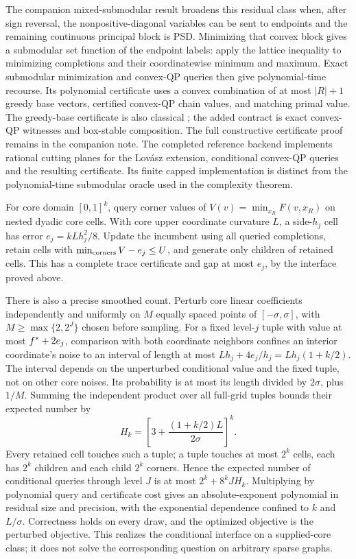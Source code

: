 The companion mixed-submodular result broadens this residual class when,
after sign reversal, the nonpositive-diagonal variables can be sent to
endpoints and the remaining continuous principal block is PSD. Minimizing
that convex block gives a submodular set function of the endpoint labels:
apply the lattice inequality to minimizing completions and their
coordinatewise minimum and maximum. Exact submodular minimization and
convex-QP queries then give polynomial-time recourse. Its polynomial
certificate uses a convex combination of at most $|R|+1$ greedy base
vectors, certified convex-QP chain values, and matching primal value.
The greedy-base certificate is also classical
\cite{IwataFleischerFujishige2001}; the added contract is exact
convex-QP witnesses and box-stable composition.
The full constructive certificate proof remains in the companion note.
The completed reference backend implements rational cutting planes for the
Lov\'asz extension, conditional convex-QP queries and the resulting
certificate. Its finite capped implementation is distinct from the
polynomial-time submodular oracle used in the complexity theorem.

For core domain $[0,1]^k$, query corner values of
$V(v)=\min_{x_R}F(v,x_R)$ on nested dyadic core cells. With core upper
coordinate curvature $L$, a side-$h_j$ cell has error
$e_j=kLh_j^2/8$. Update the incumbent using all queried completions,
retain cells with $\min_{\rm corners}V-e_j\le U$, and generate only
children of retained cells. This has a complete trace certificate and
gap at most $e_j$, by the interface proved above.

There is also a precise smoothed count. Perturb core linear coefficients
independently and uniformly on $M$ equally spaced points of
$[-\sigma,\sigma]$, with $M\ge\max\{2,2^J\}$ chosen before sampling.
For a fixed level-$j$ tuple with value at most $f^*+2e_j$, comparison
with both coordinate neighbors confines an interior coordinate's noise
to an interval of length at most $Lh_j+4e_j/h_j=Lh_j(1+k/2)$.
The interval depends on the unperturbed conditional value and the fixed
tuple, not on other core noises. Its probability is at most its length
divided by $2\sigma$, plus $1/M$. Summing the independent product over
all full-grid tuples bounds their expected number by
\[
H_k=\left[3+\frac{(1+k/2)L}{2\sigma}\right]^k.
\]
Every retained cell touches such a tuple; a tuple touches at most $2^k$
cells, each has $2^k$ children and each child $2^k$ corners. Hence the
expected number of conditional queries through level $J$ is at most
$2^k+8^kJH_k$. Multiplying by polynomial query and certificate cost
gives an absolute-exponent polynomial in residual size and precision,
with the exponential dependence confined to $k$ and $L/\sigma$.
Correctness holds on every draw, and the optimized objective is the
perturbed objective. This realizes the conditional interface on a
supplied-core class; it does not solve the corresponding question on
arbitrary sparse graphs.

